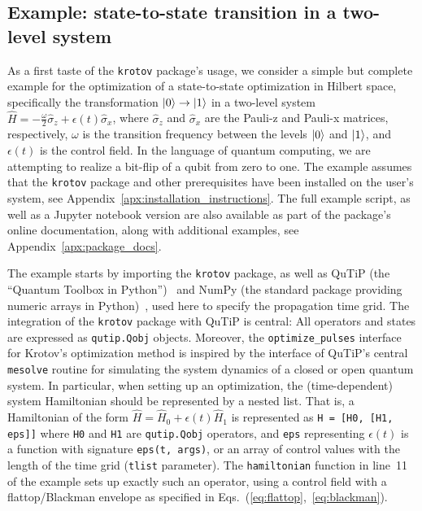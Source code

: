 \documentclass[submission, Phys]{SciPost}
\newcommand{\Op}[1]{\hat{#1}}
\begin{document}
\subsection{Example: state-to-state transition in a two-level system}%
\label{sec:overview_example}

As a first taste of the \texttt{krotov} package's usage, we consider a simple
but complete example for the optimization of a state-to-state optimization in
Hilbert space, specifically the transformation $\ket{0} \rightarrow \ket{1}$ in
a two-level system $\Op{H} = -\frac{\omega}{2} \Op{\sigma}_z + \epsilon(t)
\Op{\sigma}_x$, where $\Op{\sigma}_z$ and $\Op{\sigma}_x$ are the Pauli-z and
Pauli-x matrices, respectively, $\omega$ is the transition frequency between the
levels $\ket{0}$ and $\ket{1}$, and $\epsilon(t)$ is the control field.
In the language of quantum computing, we are attempting to realize a
bit-flip of a qubit from zero to one.
The example assumes that the \texttt{krotov} package and other prerequisites
have been installed on the user's system, see
Appendix~\ref{apx:installation_instructions}.
The full example script, as well as a Jupyter notebook version are also
available as part of the package's online documentation, along with additional
examples, see Appendix~\ref{apx:package_docs}.

\vspace{12pt}


The example starts by importing the \texttt{krotov} package, as well as QuTiP
(the ``Quantum Toolbox in Python'')~\cite{JohanssonCPC2012, JohanssonCPC2013}
and NumPy (the standard package providing numeric arrays in
Python)~\cite{van-der-WaltCSE2011}, used here to specify the propagation time
grid.
The integration of the \texttt{krotov} package with QuTiP is central: All
operators and states are expressed as \texttt{qutip.Qobj} objects.
Moreover, the \texttt{optimize\_pulses} interface for Krotov's optimization
method is inspired by the interface of QuTiP's central \texttt{mesolve} routine
for simulating the system dynamics of a closed or open quantum system.
In particular, when setting up an optimization, the (time-dependent) system
Hamiltonian should be represented by a nested list.
That is, a Hamiltonian of the form \(\Op{H} = \Op{H}_0 + \epsilon(t) \Op{H}_1\)
is represented as \texttt{H = [H0, [H1, eps]]} where \texttt{H0} and \texttt{H1}
are \texttt{qutip.Qobj} operators, and \texttt{eps} representing \(\epsilon(t)\)
is a function with signature \texttt{eps(t,\ args)}, or an array of control
values with the length of the time grid (\texttt{tlist} parameter). The
\texttt{hamiltonian} function in line~11 of the example sets up exactly such an
operator, using a control field with a flattop/Blackman envelope as specified in
Eqs.~(\ref{eq:flattop},~\ref{eq:blackman}).
\end{document}
